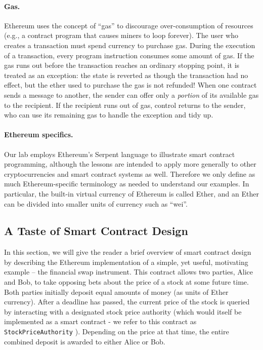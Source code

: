\documentclass{llncs}
\begin{document}
\paragraph{Gas.}
Ethereum uses 
the concept of ``gas'' to discourage over-consumption of resources (e.g.,
a contract program that causes miners to loop forever). The user who creates a transaction must spend currency to purchase gas. During the execution of a transaction, every program instruction consumes some amount of gas. If the gas runs out before the transaction reaches an ordinary stopping point, it is treated as an exception: the state is reverted as though the transaction had no effect, but the ether used to purchase the gas is not refunded! When one contract sends a message to another, the sender can offer only a \emph{portion} of its available gas to the recipient. If the recipient runs out of gas, control returns to the sender, who can use its remaining gas to handle the exception and tidy up.


\paragraph{Ethereum specifics.}
Our lab employs Ethereum's Serpent language 
to illustrate smart contract programming, although the lessons are intended to apply more generally to other cryptocurrencies and smart contract systems as well. Therefore we only define as much Ethereum-specific terminology as needed to understand our examples. In particular, the built-in virtual currency of Ethereum is called Ether, and 
an Ether can be divided into smaller units of currency such as ``wei''.

\subsection{A Taste of Smart Contract Design}

In this section, we will give the reader a brief overview of smart contract design by describing the Ethereum implementation of a simple, yet useful, motivating example -- the financial swap instrument. This contract allows two parties, Alice and Bob, to take opposing bets about the price of a stock at some future time. Both parties initially deposit equal amounts of money (as units of Ether currency). After a deadline has passed, the current price of the stock is queried by interacting with a designated stock price authority (which would itself be implemented as a smart contract - we refer to this contract as \texttt{StockPriceAuthority} ). Depending on the price at that time, the entire combined deposit is awarded to either Alice or Bob.
\end{document}
